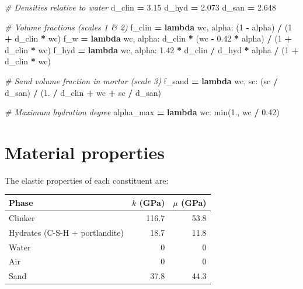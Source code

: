 \documentclass[
  a4paper,
  numbers=noendperiod,
  DIV=12]{scrreprt}
\newenvironment{Shaded}{\begin{snugshade}}{\end{snugshade}}
\newcommand{\BuiltInTok}[1]{#1}
\newcommand{\CommentTok}[1]{\textcolor[rgb]{0.56,0.35,0.01}{\textit{#1}}}
\newcommand{\DecValTok}[1]{\textcolor[rgb]{0.00,0.00,0.81}{#1}}
\newcommand{\FloatTok}[1]{\textcolor[rgb]{0.00,0.00,0.81}{#1}}
\newcommand{\KeywordTok}[1]{\textcolor[rgb]{0.13,0.29,0.53}{\textbf{#1}}}
\newcommand{\NormalTok}[1]{#1}
\newcommand{\OperatorTok}[1]{\textcolor[rgb]{0.81,0.36,0.00}{\textbf{#1}}}
\newcounter{none} %
\begin{document}
\begin{Shaded}
\begin{Highlighting}[]
\CommentTok{\# Densities relative to water}
\NormalTok{d\_clin }\OperatorTok{=} \FloatTok{3.15}
\NormalTok{d\_hyd  }\OperatorTok{=} \FloatTok{2.073}
\NormalTok{d\_san  }\OperatorTok{=} \FloatTok{2.648}

\CommentTok{\# Volume fractions (scales 1 \& 2)}
\NormalTok{f\_clin }\OperatorTok{=} \KeywordTok{lambda}\NormalTok{ wc, alpha: (}\DecValTok{1} \OperatorTok{{-}}\NormalTok{ alpha) }\OperatorTok{/}\NormalTok{ (}\DecValTok{1} \OperatorTok{+}\NormalTok{ d\_clin }\OperatorTok{*}\NormalTok{ wc)}
\NormalTok{f\_w    }\OperatorTok{=} \KeywordTok{lambda}\NormalTok{ wc, alpha: d\_clin }\OperatorTok{*}\NormalTok{ (wc }\OperatorTok{{-}} \FloatTok{0.42} \OperatorTok{*}\NormalTok{ alpha) }\OperatorTok{/}\NormalTok{ (}\DecValTok{1} \OperatorTok{+}\NormalTok{ d\_clin }\OperatorTok{*}\NormalTok{ wc)}
\NormalTok{f\_hyd  }\OperatorTok{=} \KeywordTok{lambda}\NormalTok{ wc, alpha: }\FloatTok{1.42} \OperatorTok{*}\NormalTok{ d\_clin }\OperatorTok{/}\NormalTok{ d\_hyd }\OperatorTok{*}\NormalTok{ alpha }\OperatorTok{/}\NormalTok{ (}\DecValTok{1} \OperatorTok{+}\NormalTok{ d\_clin }\OperatorTok{*}\NormalTok{ wc)}

\CommentTok{\# Sand volume fraction in mortar (scale 3)}
\NormalTok{f\_sand }\OperatorTok{=} \KeywordTok{lambda}\NormalTok{ wc, sc: (sc }\OperatorTok{/}\NormalTok{ d\_san) }\OperatorTok{/}\NormalTok{ (}\FloatTok{1.} \OperatorTok{/}\NormalTok{ d\_clin }\OperatorTok{+}\NormalTok{ wc }\OperatorTok{+}\NormalTok{ sc }\OperatorTok{/}\NormalTok{ d\_san)}

\CommentTok{\# Maximum hydration degree}
\NormalTok{alpha\_max }\OperatorTok{=} \KeywordTok{lambda}\NormalTok{ wc: }\BuiltInTok{min}\NormalTok{(}\FloatTok{1.}\NormalTok{, wc }\OperatorTok{/} \FloatTok{0.42}\NormalTok{)}
\end{Highlighting}
\end{Shaded}

\section{Material properties}\label{sec-pichler-props}

The elastic properties of each constituent are:

{\def\LTcaptype{none} %
\begin{longtable}[]{@{}lrr@{}}
\toprule\noalign{}
Phase & \(k\) (GPa) & \(\mu\) (GPa) \\
\midrule\noalign{}
\endhead
\bottomrule\noalign{}
\endlastfoot
Clinker & 116.7 & 53.8 \\
Hydrates (C-S-H + portlandite) & 18.7 & 11.8 \\
Water & 0 & 0 \\
Air & 0 & 0 \\
Sand & 37.8 & 44.3 \\
\end{longtable}
}
\end{document}
